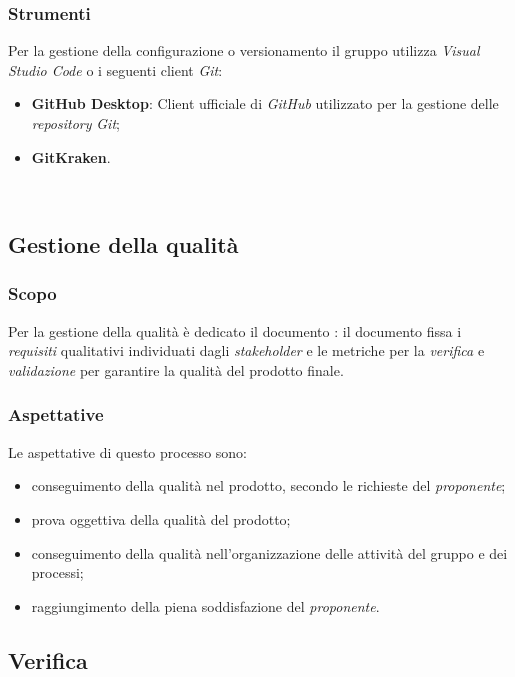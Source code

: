 		\subsubsection{Strumenti}
			Per la gestione della configurazione o versionamento il gruppo utilizza \emph{Visual Studio Code} o i seguenti client \emph{Git}:
				
				\begin{itemize}
					\item \textbf{GitHub Desktop}: Client ufficiale di \emph{GitHub} utilizzato per la gestione delle \emph{repository} \emph{Git};
					\item \textbf{GitKraken}.
				\end{itemize}\
		
		\subsection{Gestione della qualità}
			\subsubsection{Scopo}
				Per la gestione della qualità è dedicato il documento \PdQ{}: il documento fissa i \emph{requisiti} qualitativi individuati dagli \emph{stakeholder} e le metriche per la \emph{verifica} e \emph{validazione} per garantire la qualità del prodotto finale.
		
			\subsubsection{Aspettative}
				 Le aspettative di questo processo sono:
					\begin{itemize}
						\item conseguimento della qualità nel prodotto, secondo le richieste del \emph{proponente};
						\item prova oggettiva della qualità del prodotto;						
						\item conseguimento della qualità nell'organizzazione delle attività del gruppo e dei processi;
						\item raggiungimento della piena soddisfazione del \emph{proponente}.
					\end{itemize}
		
	
		\subsection{Verifica}
